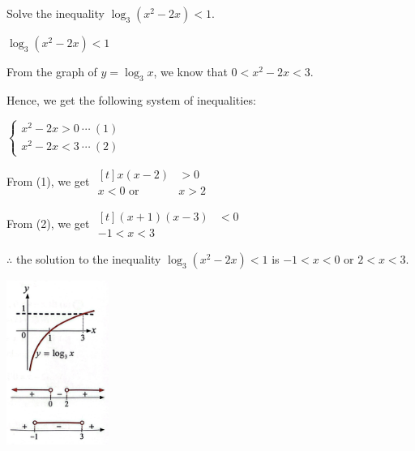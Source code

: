 \documentclass{report}
\begin{document}
        \begin{question}
            Solve the inequality $\log _3\left(x^2-2 x\right)<1$.

            \sol{}
            \vspace{-1em}
            \begin{multicols}{2}
                \noindent $\log _3\left(x^2-2 x\right)<1$
            
            \noindent From the graph of $y = \log_3 x$, we know that $0 < x^2-2 x < 3$.

            \noindent Hence, we get the following system of inequalities:
            
            \noindent $\left\{\begin{array}{l}
                x^2-2 x>0\ \cdots\ (1) \\
                x^2-2 x<3\ \cdots\ (2)
                \end{array}\right.$

                \noindent From (1), we get $\begin{aligned}[t]
                    x(x-2)&>0 \\
                    x<0 \text { or } &x>2
                    \end{aligned}$

                \noindent From (2), we get $\begin{aligned}[t]
                    (x+1)(x-3)&<0 \\
                    -1<x<3
                    \end{aligned}$

                \noindent $\therefore$ the solution to the inequality $\log _3\left(x^2-2 x\right)<1$ is $-1<x<0$ or $2<x<3$.

                \columnbreak

                \vspace*{3em}

                \begin{center}
                    \includegraphics[width=0.25\textwidth]{assets/12-9.png}
                \end{center}
            \end{multicols}
        \end{question}
\end{document}

